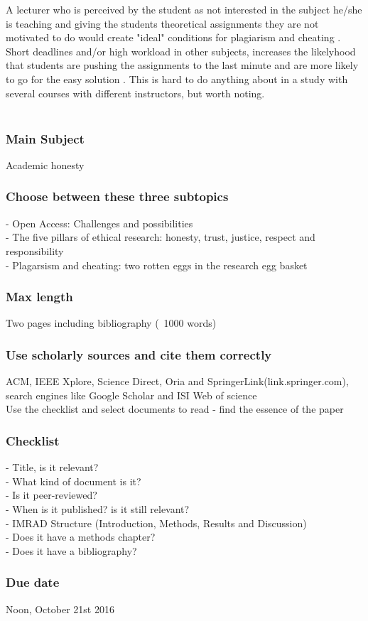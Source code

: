 \documentclass[12pt,a4paper]{article}
\begin{document}
A lecturer who is perceived by the student as not interested in the subject he/she is teaching and giving the students theoretical assignments they are not motivated to do would create "ideal" conditions for plagiarism and cheating \cite{Comas2010}. Short deadlines and/or high workload in other subjects, increases the likelyhood that students are pushing the assignments to the last minute and are more likely to go for the easy solution \cite{Comas2010}. This is hard to do anything about in a study with several courses with different instructors, but worth noting.
\\ \\

\clearpage

\subsubsection*{Main Subject}
Academic honesty

\subsubsection*{Choose between these three subtopics}

- Open Access: Challenges and possibilities\\
- The five pillars of ethical research: honesty, trust, justice, respect and responsibility\\
- Plagarsism and cheating: two rotten eggs in the research egg basket
\subsubsection*{Max length}
Two pages including bibliography (~1000 words)
\subsubsection*{Use scholarly sources and cite them correctly}
ACM, IEEE Xplore, Science Direct, Oria and SpringerLink(link.springer.com), search engines like Google Scholar and ISI Web of science\\
Use the checklist and select documents to read - find the essence of the paper
\subsubsection*{Checklist}
- Title, is it relevant? \\
- What kind of document is it? \\
- Is it peer-reviewed? \\
- When is it published? is it still relevant?\\
- IMRAD Structure (Introduction, Methods, Results and Discussion)\\
- Does it have a methods chapter?\\
- Does it have a bibliography? \\
\subsubsection*{Due date}
Noon, October 21st 2016
\end{document}
